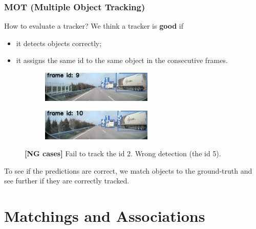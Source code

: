 \documentclass[slidetop, mathserif]{beamer}
\begin{document}
\begin{frame}
	\frametitle{MOT (Multiple Object Tracking)}

	How to evaluate a tracker? We think a tracker is {\bf good} if
	\begin{itemize}
	\item it detects objects correctly;
	\item
		it assigns the same id to the same object in the consecutive frames.
	\end{itemize}

	\vspace{-8pt}

	\begin{figure}
		\begin{subfigure}{.48\textwidth}
		\includegraphics[width=150pt]{pics/track03.jpg}
		\end{subfigure}
		\begin{subfigure}{.48\textwidth}
		\includegraphics[width=150pt]{pics/track04.jpg}
		\end{subfigure}
		\caption{{\color{red}\bf [NG cases]} Fail to track the id 2. Wrong detection (the id 5).}
	\end{figure}

	\vspace{-15pt}
	To see if the predictions are correct, we match objects to the ground-truth
	and see further if they are correctly tracked.

\end{frame}

\section{Matchings and Associations}
\end{document}
